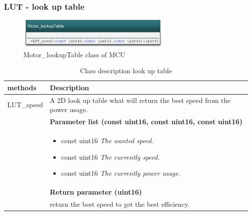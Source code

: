 \subsubsection{LUT - look up table}

\begin{figure}[H]
	\centering
	\includegraphics [width=3in]{Software/Pictures/class-diagram-LUT.png}
	\caption{Motor\_lookupTable class of MCU}
	\label{fig:Class_diagram_MCU_LUT}
\end{figure}

\begin{table}[H]
	\centering
	\begin{tabular}{|p{5 cm}|p{10 cm}|}
		\hline
		\textbf{methods} & \textbf{Description} \\ \hline
		
		LUT\_speed
		& A 2D look up table what will return the best speed from the power usage.
		\\ & \textbf{Parameter list (const uint16, const uint16, const uint16)}
		\\ & \begin{itemize}
			\item {\large const uint16}
			\subitem \textit{The wanted speed.}
			\item {\large const uint16}
			\subitem \textit{The currently speed.}
			\item {\large const uint16}
			\subitem \textit{The currently power usage.}
		\end{itemize}
		\\ & \textbf{Return parameter (uint16)}
		\\ & return the best speed to get the best efficiency.
		\\ \hline
		
	\end{tabular}
	\caption{Class description look up table}
	\label{table:Class_description_MCU_LUT}
\end{table}

